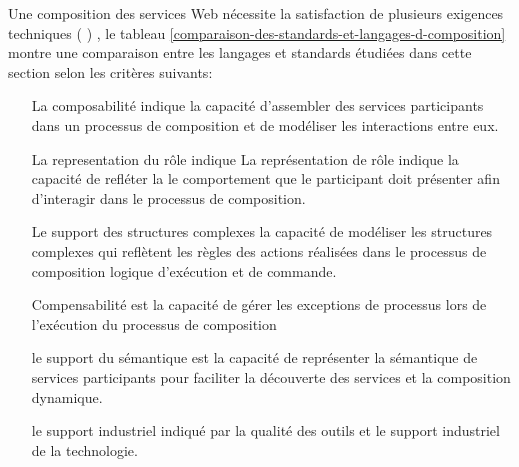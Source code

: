     Une composition des services Web nécessite la satisfaction de
    plusieurs exigences techniques (\cite{sheng2014web}
    \cite{bucchiarone2006survey}) , le tableau
    \ref{comparaison-des-standards-et-langages-d-composition} montre
    une comparaison entre les langages et standards étudiées dans
    cette section selon les critères suivants:
    
    \SpecialItem
    \begin{itemize}
      \item [La composabilité] indique la capacité
        d'assembler des services participants dans un processus de
        composition et de modéliser les interactions entre eux.

      \item [La representation du rôle] indique La représentation de
        rôle indique la capacité de refléter la le comportement que le
        participant doit présenter afin d'interagir dans le processus
        de composition.

      \item [Le support des structures complexes] la capacité de
        modéliser les structures complexes qui reflètent les règles
        des actions réalisées dans le processus de composition logique
        d'exécution et de commande.

      \item [Compensabilité] est la capacité de gérer les
        exceptions de processus lors de l'exécution du processus de
        composition

      \item [le support du sémantique] est la capacité de représenter
        la sémantique de services participants pour faciliter la
        découverte des services et la composition dynamique.

      \item [le support industriel] indiqué par la qualité des outils
        et le support industriel de la technologie.
    \end{itemize}



